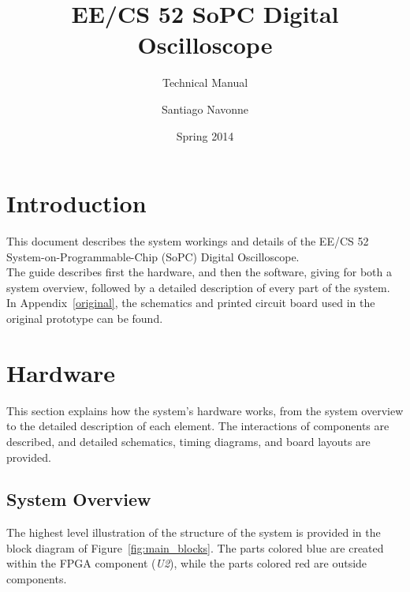 \documentclass[titlepage]{scrartcl}
\begin{document}
\pagestyle{plain}

	\title{EE/CS 52 SoPC Digital Oscilloscope}
	\subtitle{Technical Manual}
	\author{Santiago Navonne} 
	\date{Spring 2014} 
	\maketitle
	

	\tableofcontents
	\clearpage


	\section{Introduction}
	This document describes the system workings and details of the EE/CS 52 System-on-Programmable-Chip (SoPC) Digital Oscilloscope.\\

	The guide describes first the hardware, and then the software, giving for both a system overview, followed by a detailed description of every part of the system. In Appendix~\ref{original}, the schematics and printed circuit board used in the original prototype can be found.


	\section{Hardware}
	This section explains how the system's hardware works, from the system overview to the detailed description of each element. The interactions of components are described, and detailed schematics, timing diagrams, and board layouts are provided.
	
	\subsection{System Overview \label{sec:overview}}
	The highest level illustration of the structure of the system is provided in the block diagram of Figure~\ref{fig:main_blocks}. The parts colored blue are created within the FPGA component (\textit{U2}), while the parts colored red are outside components.\\
\end{document}
